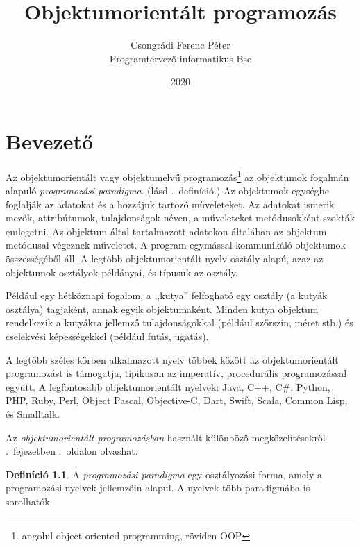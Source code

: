 \documentclass[]{thesis-ekf}
\theoremstyle{definition}
\newtheorem{definicio}{Definíció}[chapter]
\begin{document}
	\title{Objektumorientált programozás}
	\author{Csongrádi Ferenc Péter\\Programtervező informatikus Bsc}
	\date{2020}
	
	\maketitle
	\tableofcontents
	\chapter{Bevezető}
	Az objektumorientált vagy objektumelvű programozás\footnote{angolul object-oriented programming, röviden OOP} az objektumok fogalmán alapuló \emph{programozási paradigma}. (lásd \az{\ref{paradigma}}.~definíció.) Az objektumok egységbe foglalják az adatokat és a hozzájuk tartozó műveleteket. Az adatokat ismerik mezők, attribútumok, tulajdonságok néven, a műveleteket metódusokként szokták emlegetni. Az objektum által tartalmazott adatokon általában az objektum metódusai végeznek műveletet. A program egymással kommunikáló objektumok összességéből áll.\cite{Kindler2011} A legtöbb objektumorientált nyelv osztály alapú, azaz az objektumok osztályok példányai, és típusuk az osztály.
	
	Például egy hétköznapi fogalom, a ,,kutya'' felfogható egy osztály (a kutyák osztálya) tagjaként, annak egyik objektumaként. Minden kutya objektum rendelkezik a kutyákra jellemző tulajdonságokkal (például szőrszín, méret stb.) és cselekvési képességekkel (például futás, ugatás).
	
	A legtöbb széles körben alkalmazott nyelv többek között az objektumorientált programozást is támogatja, tipikusan az imperatív, procedurális programozással együtt. A legfontosabb objektumorientált nyelvek: Java, C++, C\#, Python, PHP, Ruby, Perl, Object Pascal, Objective-C, Dart, Swift, Scala, Common Lisp, és Smalltalk.
	
	Az \emph{objektumorientált programozásban} használt különböző megközelítésekről  \az{\ref{fejezet-megk}}.~fejezetben	\az{\pageref{fejezet-megk}}.~oldalon olvashat.
	
	\begin{definicio}\label{paradigma}
		A \emph{programozási paradigma} egy osztályozási forma, amely a programozási nyelvek jellemzőin alapul. A nyelvek több paradigmába is sorolhatók.
	\end{definicio}
	
\end{document}
